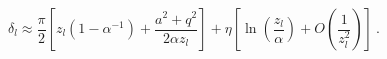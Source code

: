 \begin{equation}
\delta_l\approx\frac\pi2\left[z_l(1-\alpha^{-1})+\frac{a^2+q^2}{2\alpha z_l}\right] +\eta\left[\ln\left(\frac{z_l}\alpha\right)+O\left(\frac1{z_l^2}\right) \right] \ .
\end{equation}

